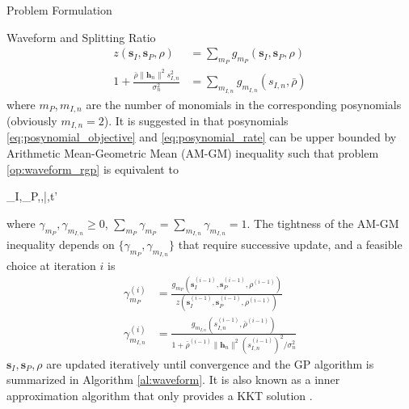\documentclass{IEEEtran}
\begin{document}
\begin{section}{Problem Formulation}
\begin{subsection}{Waveform and Splitting Ratio}
		\begin{align}
			z(\boldsymbol{s}_I,\boldsymbol{s}_P,\rho)&=\sum_{m_P}{g_{m_P}(\boldsymbol{s}_I,\boldsymbol{s}_P,\rho)}\label{eq:posynomial_objective}\\
			1+\frac{\bar{\rho}\lVert{\boldsymbol{h}_n}\rVert^2 s_{I,n}^2}{\sigma_n^2}&=\sum_{m_{I,n}}g_{m_{I,n}}(s_{I,n},\bar{\rho})\label{eq:posynomial_rate}
		\end{align}
		where $m_P,m_{I,n}$ are the number of monomials in the corresponding posynomials (obviously $m_{I,n}=2$). It is suggested in \cite{Clerckx2018b,Chiang2005} that posynomials \ref{eq:posynomial_objective} and \ref{eq:posynomial_rate} can be upper bounded by Arithmetic Mean-Geometric Mean (AM-GM) inequality such that problem \ref{op:waveform_rgp} is equivalent to
		\begin{mini}
			{\boldsymbol{s}_I,_P,\rho,\bar{\rho},t'}{}{\label{op:waveform_gp}}{}
		\end{mini}
		where $\gamma_{m_P},\gamma_{m_{I,n}} \ge 0$, $\sum_{m_P}\gamma_{m_P}=\sum_{m_{I,n}}\gamma_{m_{I,n}}=1$. The tightness of the AM-GM inequality depends on $\{\gamma_{m_P},\gamma_{m_{I,n}}\}$ that require successive update, and a feasible choice at iteration $i$ is \cite{Clerckx2018b}
		\begin{align}
			\gamma_{m_P}^{(i)} & = \frac{g_{m_P}(\boldsymbol{s}_I^{(i-1)},\boldsymbol{s}_P^{(i-1)},\rho^{(i-1)})}{z(\boldsymbol{s}_I^{(i-1)},\boldsymbol{s}_P^{(i-1)},\rho^{(i-1)})}\label{eq:gamma_P}\\
			\gamma_{m_{I,n}}^{(i)} & = \frac{g_{m_{I,n}}(s_{I,n}^{(i-1)},\bar{\rho}^{(i-1)})}{1+{\bar{\rho}^{(i-1)}\lVert{\boldsymbol{h}_n}\rVert^2 (s_{I,n}^{(i-1)})^2}/{\sigma_n^2}}\label{eq:gamma_I}
		\end{align}
		$\boldsymbol{s}_I,\boldsymbol{s}_P,\rho$ are updated iteratively until convergence and the GP algorithm is summarized in Algorithm \ref{al:waveform}. It is also known as a inner approximation algorithm that only provides a KKT solution \cite{Marks1978}.
		\begin{algorithm}
			\caption{GP: Waveform and Splitting Ratio}

\end{algorithm}
\end{subsection}
\end{section}
\end{document}
